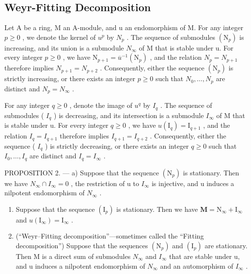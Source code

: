 \subsection{Weyr-Fitting Decomposition}

Let A be a ring, M an A-module, and u an endomorphism of M. For any integer \(p \geqslant 0\) , we denote the kernel of \(u^{p}\) by \(N_{p}\) . The sequence of submodules \((\mathrm{N}_{p})\) is increasing, and its union is a submodule \(N_{\infty}\) of M that is stable under u. For every integer \(p \geqslant 0\) , we have \(\mathrm{N}_{p+1} = \overline{u}^{-1}(\mathrm{N}_{p})\) , and the relation \(N_{p} = N_{p+1}\) therefore implies \(N_{p+1} = N_{p+2}\) . Consequently, either the sequence \((\mathrm{N}_{p})\) is strictly increasing, or there exists an integer \(p \geqslant 0\) such that \(N_{0}, \ldots, N_{p}\) are distinct and \(N_{p} = N_{\infty}\) .

For any integer \(q \geqslant 0\) , denote the image of \(u^{q}\) by \(I_{q}\) . The sequence of submodules ( \(I_{q}\) ) is decreasing, and its intersection is a submodule \(I_{\infty}\) of M that is stable under u. For every integer \(q \geqslant 0\) , we have \(u(\mathrm{I}_{q}) = \mathrm{I}_{q+1}\) , and the relation \(I_{q} = I_{q+1}\) therefore implies \(I_{q+1} = I_{q+2}\) . Consequently, either the sequence ( \(I_{q}\) ) is strictly decreasing, or there exists an integer \(q \geqslant 0\) such that \(I_{0}, \ldots, I_{q}\) are distinct and \(I_{q} = I_{\infty}\) .

PROPOSITION 2. --- a) Suppose that the sequence \((\mathrm{N}_{p})\) is stationary. Then we have \(N_{\infty} \cap I_{\infty} = 0\) , the restriction of u to \(I_{\infty}\) is injective, and u induces a nilpotent endomorphism of \(N_{\infty}\) .

\begin{enumerate}
\def\labelenumi{\alph{enumi})}
\setcounter{enumi}{1}
\item
  Suppose that the sequence \((\mathrm{I}_p)\) is stationary. Then we have \(\mathbf{M} = \mathrm{N}_{\infty} + \mathrm{I}_{\infty}\) and \(u(\mathrm{I}_{\infty}) = \mathrm{I}_{\infty}\) .
\item
  (``Weyr--Fitting decomposition''---sometimes called the ``Fitting decomposition'') Suppose that the sequences \((\mathrm{N}_{p})\) and \((\mathrm{I}_{p})\) are stationary. Then M is a direct sum of submodules \(N_{\infty}\) and \(I_{\infty}\) that are stable under u, and u induces a nilpotent endomorphism of \(N_{\infty}\) and an automorphism of \(I_{\infty}\) .
\end{enumerate}

